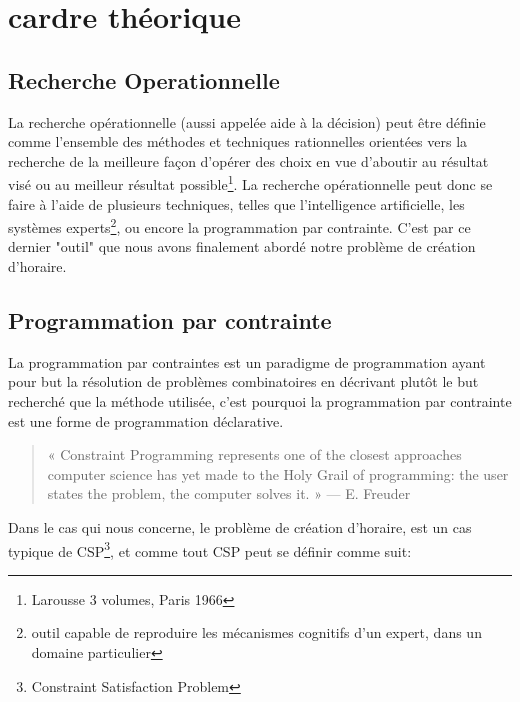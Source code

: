 \section{cardre théorique}
\subsection{Recherche Operationnelle}
La recherche opérationnelle (aussi appelée aide à la décision) peut être définie comme l'ensemble des méthodes et techniques rationnelles orientées vers la recherche de la meilleure façon d'opérer des choix en vue d'aboutir au résultat visé ou au meilleur résultat possible\footnote{Larousse 3 volumes, Paris 1966}.
La recherche opérationnelle peut donc se faire à l'aide de plusieurs techniques, telles que l'intelligence artificielle, les systèmes experts\footnote{outil capable de reproduire les mécanismes cognitifs d'un expert, dans un domaine particulier}, ou encore la programmation par contrainte.  C'est par ce dernier "outil" que nous avons finalement abordé notre problème de création d'horaire.
\subsection{Programmation par contrainte}

La programmation par contraintes est un paradigme de programmation ayant pour but la résolution de problèmes combinatoires en
 décrivant plutôt le but recherché que la méthode utilisée, c'est pourquoi la programmation par contrainte est une forme de programmation déclarative.
\begin{quote}
« Constraint Programming represents one of the closest approaches computer science has yet made to the Holy Grail of programming: the user states the problem, the computer solves it. »
— E. Freuder
\end{quote}

Dans le cas qui nous concerne, le problème de création d'horaire, est un cas typique de CSP\footnote{Constraint Satisfaction Problem}, et comme tout CSP peut se définir comme suit:
   

